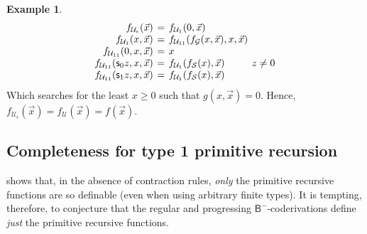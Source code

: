 \documentclass[manuscript,screen]{acmart}
\theoremstyle{definition}
\newtheorem{exmp}[thm]{Example}
\theoremstyle{remark}
\renewcommand{\succ}[1]{\mathsf{s}_{#1}}
\newcommand{\denot}[1]{f_{#1}}
\newcommand{\successor}{\mathcal{S}}
\newcommand{\unbounded}{\mathcal{U}}
\newcommand{\gfunction}{\mathcal{G}}
\newcommand{\bc}{\mathsf{B}}
\newcommand{\bcnorec}{\bc^{-}}
\newcommand{\der}{\mathcal{D}}
\newcommand{\pder}[1]{\der_{#1}}
\begin{document}
\begin{exmp}
\[
\arraycolsep=2pt
\begin{array}{rcll}
 \denot{\unbounded_{\epsilon}}  (\vec x) & = & \denot{\unbounded_{1}}(0, \vec x) \\
  \denot{\unbounded_{1}}  (x,\vec x) & = & \denot{\unbounded_{11}}(\denot{\gfunction}(x,\vec{x}) ,x, \vec x) \\
   \denot{\unbounded_{11}}(0,x, \vec x) & = & x \\
   \denot{\unbounded_{11}}(\succ 0z,x, \vec x) & = &\denot{\unbounded_{1}}( \denot\successor(x), \vec x) & z \neq 0 \\
   \denot{\unbounded_{11}}(\succ 1z,x, \vec x) & = & \denot{\unbounded_{1}}( \denot\successor(x), \vec x)
\end{array}
\]
Which searches for the least $x \geq 0$ such that $g(x,\vec x)=0$. Hence, $\denot{\unbounded_\epsilon}(\vec x)=\denot{\unbounded}(\vec x)=f(\vec x)$.
\end{exmp}

\subsection{Completeness for type 1 primitive recursion}

\cite{Kuperberg-Pous21} shows that, in the absence of contraction rules, \emph{only} the primitive recursive functions are so definable (even when using arbitrary finite types).
It is tempting, therefore, to conjecture that the regular and progressing $\bcnorec$-coderivations define \emph{just} the primitive recursive functions.
\end{document}
